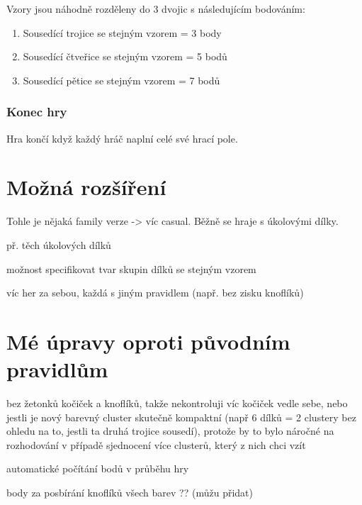 Vzory jsou náhodně rozděleny do 3 dvojic s následujícím bodováním:
\begin{enumerate}
    \item Sousedící trojice se stejným vzorem = 3 body
    \item Sousedící čtveřice se stejným vzorem = 5 bodů
    \item Sousedící pětice se stejným vzorem = 7 bodů
\end{enumerate}

\subsubsection*{Konec hry}

Hra končí když každý hráč naplní celé své hrací pole.


\section{Možná rozšíření}

Tohle je nějaká family verze -> víc casual. Běžně se hraje s úkolovými dílky.

př. těch úkolových dílků

možnost specifikovat tvar skupin dílků se stejným vzorem

víc her za sebou, každá s jiným pravidlem (např. bez zisku knoflíků)

\section{Mé úpravy oproti původním pravidlům}

bez žetonků kočiček a knoflíků, takže nekontroluji víc kočiček vedle sebe, nebo jestli je nový barevný cluster skutečně kompaktní (např 6 dílků = 2 clustery bez ohledu na to, jestli ta druhá trojice sousedí), protože by to bylo náročné na rozhodování v případě sjednocení více clusterů, který z nich chci vzít

automatické počítání bodů v průběhu hry 

body za posbírání knoflíků všech barev ?? (můžu přidat)

